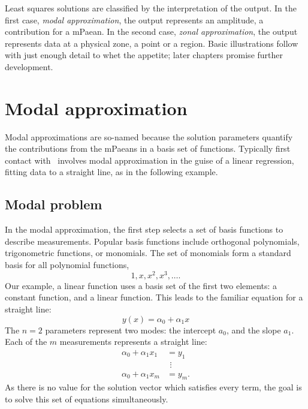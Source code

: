 Least squares solutions are classified by the interpretation of the output. In the first case, \emph{modal approximation}, the output represents an amplitude, a contribution for a mPaean. In the second case, \emph{zonal approximation}, the output represents data at a physical zone, a point or a region. Basic illustrations follow with just enough detail to whet the appetite; later chapters promise further development.

%

\section{\label{ssec:modal approx}Modal approximation}  
Modal approximations are so-named because the solution parameters quantify the contributions from the mPaeans in a basis set of functions. Typically first contact with \tmls\ involves modal approximation in the guise of a linear regression, fitting data to a straight line, as in the following example.


\subsection{\label{ssec:modal problem}Modal problem}  
In the modal approximation, the first step selects a set of basis functions to describe measurements. Popular basis functions include orthogonal polynomials, trigonometric functions, or monomials. The set of monomials form a standard basis for all polynomial functions,
%
\begin{equation*}
	1, x, x^{2}, x^{3}, \dots.
\end{equation*}
%
Our example, a linear function uses a basis set of the first two elements: a constant function, and a linear function. This leads to the familiar equation for a straight line:
%
\begin{equation}
	y(x) = \alpha_{0} + \alpha_{1} x
\label{eq:ch-01:straight line}
\end{equation}
%
The $n=2$ parameters represent two modes: the intercept $a_{0}$, and the slope $a_{1}$. Each of the $m$ measurements represents a straight line:
%
\begin{equation}
	\begin{split}
		\alpha_{0} + \alpha_{1} x_{1} &= y_{1} \\
			& \ \, \vdots \\
		\alpha_{0} + \alpha_{1} x_{m} &= y_{m} .
	\end{split}
\label{eq:ch-01:modal:modal}
\end{equation}
%
As there is no value for the solution vector which satisfies every term, the goal is to solve this set of equations simultaneously.

